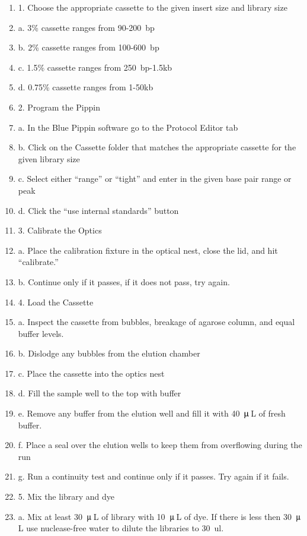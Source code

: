 \documentclass[graybox]{svmult}
\begin{document}
\begin{enumerate}
\item{1.      Choose the appropriate cassette to the given insert size and library size}
\item{a.      3\% cassette ranges from 90-200~bp}
\item{b.      2\% cassette ranges from 100-600~bp}
\item{c.      1.5\% cassette ranges from 250~bp-1.5kb}
\item{d.      0.75\% cassette ranges from 1-50kb}
\item{2.      Program the Pippin}
\item{a.      In the Blue Pippin software go to the Protocol Editor tab}
\item{b.      Click on the Cassette folder that matches the appropriate cassette for the given library size}
\item{c.      Select either “range” or “tight” and enter in the given base pair range or peak}
\item{d.      Click the “use internal standards” button}
\item{3.      Calibrate the Optics}
\item{a.      Place the calibration fixture in the optical nest, close the lid, and hit “calibrate.”}
\item{b.      Continue only if it passes, if it does not pass, try again.}
\item{4.      Load the Cassette}
\item{a.      Inspect the cassette from bubbles, breakage of agarose column, and equal buffer levels.}
\item{b.      Dislodge any bubbles from the elution chamber}
\item{c.      Place the cassette into the optics nest}
\item{d.      Fill the sample well to the top with buffer}
\item{e.      Remove any buffer from the elution well and fill it with 40~$\umu$\,L of fresh buffer.}
\item{f.      Place a seal over the elution wells to keep them from overflowing during the run}
\item{g.      Run a continuity test and continue only if it passes. Try again if it fails.}
\item{5.      Mix the library and dye}
\item{a.      Mix at least 30~$\umu$\,L of library with 10~$\umu$\,L of dye. If there is less then 30~$\umu$\,L use nuclease-free water to dilute the libraries to 30~ul.}

\end{enumerate}
\end{document}

